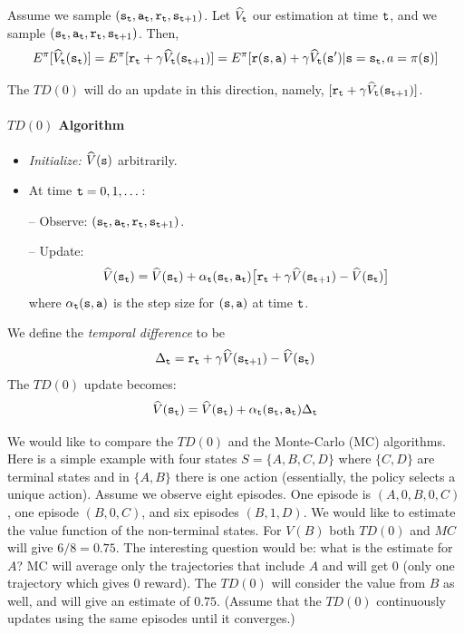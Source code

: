 Assume we sample
$({\tt s}_{\tt t},{\tt a}_{\tt t},{\tt r}_{\tt t},{\tt s}_{{\tt t}+1})$.
Let $\widehat{V}_{\tt t}$ our estimation at time ${\tt t}$,
and we sample
$({\tt s}_{\tt t},{\tt a}_{\tt t},{\tt r}_{\tt t},{\tt s}_{{\tt t}+1})$.
Then,
\[
E^\pi[\widehat{V}_{\tt t}({\tt s}_{\tt t})]=
E^\pi[{\tt r}_{\tt t}+\gamma
\widehat{V}_{\tt t}({\tt s}_{{\tt t}+1})]=E^\pi[{\tt r}({\tt s},{\tt a})+\gamma
\widehat{V}_{\tt t}({\tt s}')|{\tt s}={\tt s}_{\tt t},a=\pi({\tt s})]
\]

The $TD(0)$ will do an update in this direction, namely,
$[{\tt r}_{\tt t}+\gamma \widehat{V}_{\tt t}({\tt s}_{{\tt t}+1})]$.

\paragraph{$TD(0)$ Algorithm}

\begin{itemize}
\item \emph{Initialize:} $\widehat{V}({\tt s})$ arbitrarily.

\item At time ${\tt t}=0,1,\dots$:


-- Observe: $({\tt s}_{\tt t}, {\tt a}_{\tt t}, {\tt r}_{\tt t},
{\tt s}_{{\tt t}+1})$.

-- Update:
\[
\widehat{V}({\tt s}_{\tt t})=\widehat{V}({\tt s}_{\tt t})+\alpha_{\tt t}({\tt s}_{\tt t},{\tt a}_{\tt t})
\big[{\tt r}_{\tt t}+\gamma
\widehat{V}({\tt s}_{{\tt t}+1})-\widehat{V}({\tt s}_{\tt t})\big]
\]
where $\alpha_{\tt t}({\tt s},{\tt a})$ is the step size for
$({\tt s},{\tt a})$ at time ${\tt t}$.
\end{itemize}

We define the {\em temporal difference} to be
\[
\Delta_{\tt t} ={\tt r}_{\tt t}+\gamma
\widehat{V}({\tt s}_{{\tt t}+1})-\widehat{V}({\tt s}_{\tt t})
\]
The $TD(0)$ update becomes:
\[
\widehat{V}({\tt s}_{\tt t})=\widehat{V}({\tt s}_{\tt t})+\alpha_{\tt t}({\tt s}_{\tt t},{\tt a}_{\tt t})\Delta_{\tt t}
\]



We would like to compare the $TD(0)$ and the Monte-Carlo (MC)
algorithms. Here is a simple example with four states
$S=\{A,B,C,D\}$ where $\{C,D\}$ are terminal states and in $\{A,B\}$
there is one action (essentially, the policy selects a unique
action). Assume we observe eight episodes. One episode is
$(A,0,B,0,C)$, one episode $(B,0,C)$, and six episodes $(B,1,D)$. We
would like to estimate the value function of the non-terminal
states. For $V(B)$ both $TD(0)$ and $MC$ will give $6/8=0.75$. The
interesting question would be: what is the estimate for $A$? MC will
average only the trajectories that include $A$ and will get $0$
(only one trajectory which gives $0$ reward). The $TD(0)$ will
consider the value from $B$ as well, and will give an estimate of
$0.75$. (Assume that the $TD(0)$ continuously updates using the same
episodes until it converges.)

